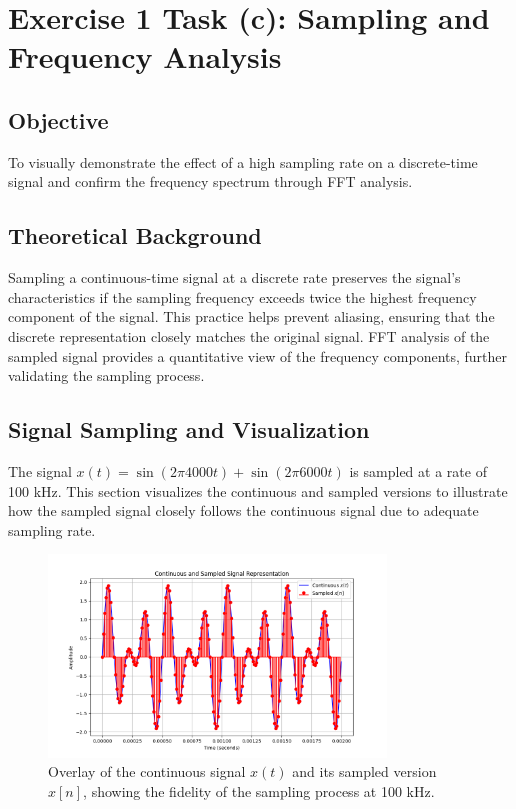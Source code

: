 
\item[(c)]
\section*{Exercise 1 Task (c): Sampling and Frequency Analysis}

\subsection*{Objective}
To visually demonstrate the effect of a high sampling rate on a discrete-time signal and confirm the frequency spectrum through FFT analysis.

\subsection*{Theoretical Background}
Sampling a continuous-time signal at a discrete rate preserves the signal's characteristics if the sampling frequency exceeds twice the highest frequency component of the signal. This practice helps prevent aliasing, ensuring that the discrete representation closely matches the original signal. FFT analysis of the sampled signal provides a quantitative view of the frequency components, further validating the sampling process.

\subsection*{Signal Sampling and Visualization}
The signal $x(t) = \sin(2\pi 4000t) + \sin(2\pi 6000t)$ is sampled at a rate of 100 kHz. This section visualizes the continuous and sampled versions to illustrate how the sampled signal closely follows the continuous signal due to adequate sampling rate.

\begin{figure}[h]
    \centering
    \includegraphics[width=0.8\textwidth]{fig/ex1_c_plot.png}
    \caption{Overlay of the continuous signal $x(t)$ and its sampled version $x[n]$, showing the fidelity of the sampling process at 100 kHz.}
    \label{fig:ex1c_signal_sampling}
\end{figure}

